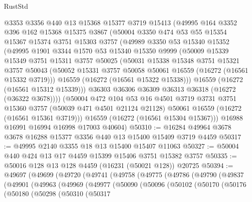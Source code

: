 \begin{lexlean}{RustStd}
\begin{coremodule}
    @3353
    @3356
    @440
    @13
    @15368
    @15377
    @3719
    @15413
    (@49995
      @164
      @3352
      @396
      @162
      @15368
      @15375
      @3867
      (@50004
        @3350
        @474
        @53
        @55
        @15354
        @15367
        @15374
        @3751
        @15303
        @3757
        (@49989
          @3350
          @53
          @15340
          @15352
          (@49995
            @1901
            @3344
            @1570
            @53
            @15340
            @15350
            @9999
            (@50009
              @15339
              @15349
              @3751
              @15311
              @3757
              @50025
              (@50031
                @15338
                @15348
                @3751
                @15321
                @3757
                @50043
                (@50052 @15331 @3757 @50058 @50061 @16559 (@16272 (@16561 @15332 @3719)))
                @16559
                (@16272 (@16561 @15322 @15338)))
              @16559
              (@16272 (@16561 @15312 @15339)))
            @36303
            @36306
            @36309
            @36313
            @36318
            (@16272 (@36322 @3678))))
        (@50004
          @472
          @104
          @53
          @16
          @4501
          @3719
          @3731
          @3751
          @15360
          @3757
          (@50039 @471 @4501 @21124 @21128)
          @50061
          @16559
          (@16272 (@16561 @15361 @3719)))
        @16559
        (@16272 (@16561 @15304 @15367)))
      @16988
      @16991
      @16994
      @16998
      @17003
      @40604)
@50310 := @16284 @49964 @3678 @3678 @16288 @15377 @3356 @440 @13 @15400 @15409 @3719 @4459
@50317 := @49995 @2140 @3355 @18 @13 @15400 @15407 @11063
@50327 := @50004 @440 @424 @13 @17 @4459 @15399 @15406 @3751 @15382 @3757
@50335 := @50016 @128 @13 @128 @4459 (@16231 (@50021 @128)) @20725
@50394 := @49697
    (@49699
      (@49720
        (@49741
          (@49758
            (@49775
              (@49786
                (@49790
                  (@49837
                    (@49901
                      (@49963
                        (@49969
                          (@49977
                            (@50090
                              (@50096
                                (@50102
                                  (@50170
                                    (@50176
                                      (@50180
                                        (@50298
                                          (@50310
                                            (@50317

\end{coremodule}
\end{lexlean}
